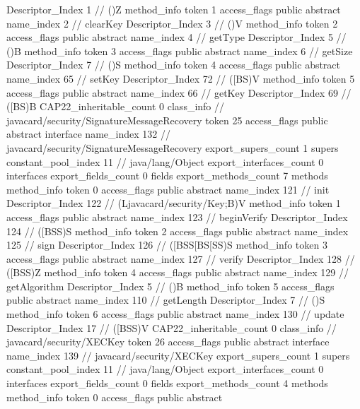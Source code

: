{{{{{					Descriptor_Index	1		// ()Z
				}
				method_info {
					token	1
					access_flags	public abstract
					name_index	2		// clearKey
					Descriptor_Index	3		// ()V
				}
				method_info {
					token	2
					access_flags	public abstract
					name_index	4		// getType
					Descriptor_Index	5		// ()B
				}
				method_info {
					token	3
					access_flags	public abstract
					name_index	6		// getSize
					Descriptor_Index	7		// ()S
				}
				method_info {
					token	4
					access_flags	public abstract
					name_index	65		// setKey
					Descriptor_Index	72		// ([BS)V
				}
				method_info {
					token	5
					access_flags	public abstract
					name_index	66		// getKey
					Descriptor_Index	69		// ([BS)B
				}
			}
			CAP22_inheritable_count	0
		}
		class_info {		// javacard/security/SignatureMessageRecovery
			token	25
			access_flags	public abstract interface
			name_index	132		// javacard/security/SignatureMessageRecovery
			export_supers_count	1
			supers {
				constant_pool_index	11		// java/lang/Object
			}
			export_interfaces_count	0
			interfaces {
			}
			export_fields_count	0
			fields {
			}
			export_methods_count	7
			methods {
				method_info {
					token	0
					access_flags	public abstract
					name_index	121		// init
					Descriptor_Index	122		// (Ljavacard/security/Key;B)V
				}
				method_info {
					token	1
					access_flags	public abstract
					name_index	123		// beginVerify
					Descriptor_Index	124		// ([BSS)S
				}
				method_info {
					token	2
					access_flags	public abstract
					name_index	125		// sign
					Descriptor_Index	126		// ([BSS[BS[SS)S
				}
				method_info {
					token	3
					access_flags	public abstract
					name_index	127		// verify
					Descriptor_Index	128		// ([BSS)Z
				}
				method_info {
					token	4
					access_flags	public abstract
					name_index	129		// getAlgorithm
					Descriptor_Index	5		// ()B
				}
				method_info {
					token	5
					access_flags	public abstract
					name_index	110		// getLength
					Descriptor_Index	7		// ()S
				}
				method_info {
					token	6
					access_flags	public abstract
					name_index	130		// update
					Descriptor_Index	17		// ([BSS)V
				}
			}
			CAP22_inheritable_count	0
		}
		class_info {		// javacard/security/XECKey
			token	26
			access_flags	public abstract interface
			name_index	139		// javacard/security/XECKey
			export_supers_count	1
			supers {
				constant_pool_index	11		// java/lang/Object
			}
			export_interfaces_count	0
			interfaces {
			}
			export_fields_count	0
			fields {
			}
			export_methods_count	4
			methods {
				method_info {
					token	0
					access_flags	public abstract
}}}}}
